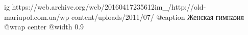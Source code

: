  
 
 
 
 

\ifcmt
  ig https://web.archive.org/web/20160417235612im_/http://old-mariupol.com.ua/wp-content/uploads/2011/07/%
  @caption Женская гимназия
  @wrap center
  @width 0.9
\fi
